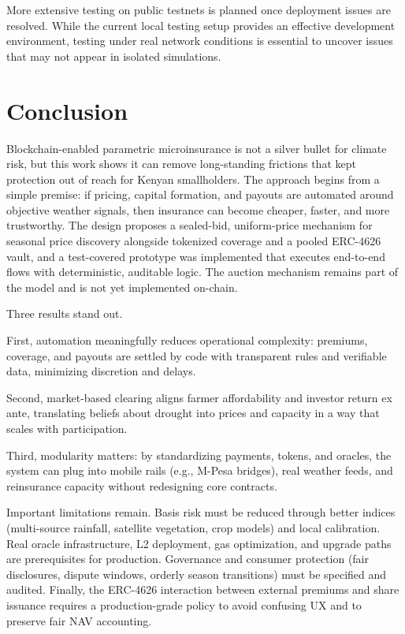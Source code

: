 \documentclass[11pt,a4paper]{article}
\begin{document}
		More extensive testing on public testnets is planned once deployment issues are resolved.
		While the current local testing setup provides an effective development environment, testing under real network conditions is essential to uncover issues that may not appear in isolated simulations.

		\section{Conclusion}\label{sec:conclusion}
		Blockchain-enabled parametric microinsurance is not a silver bullet for climate risk, but this work shows it can remove long-standing frictions that kept protection out of reach for Kenyan smallholders.
        The approach begins from a simple premise: if pricing, capital formation, and payouts are automated around objective weather signals, then insurance can become cheaper, faster, and more trustworthy.
        The design proposes a sealed-bid, uniform-price mechanism for seasonal price discovery alongside tokenized coverage and a pooled ERC-4626 vault, and a test-covered prototype was implemented that executes end-to-end flows with deterministic, auditable logic. The auction mechanism remains part of the model and is not yet implemented on-chain.

		Three results stand out.

        First, automation meaningfully reduces operational complexity: premiums, coverage, and payouts are settled by code with transparent rules and verifiable data, minimizing discretion and delays.

        Second, market-based clearing aligns farmer affordability and investor return ex ante, translating beliefs about drought into prices and capacity in a way that scales with participation.

        Third, modularity matters: by standardizing payments, tokens, and oracles, the system can plug into mobile rails (e.g., M-Pesa bridges), real weather feeds, and reinsurance capacity without redesigning core contracts.

		Important limitations remain.
        Basis risk must be reduced through better indices (multi-source rainfall, satellite vegetation, crop models) and local calibration.
        Real oracle infrastructure, L2 deployment, gas optimization, and upgrade paths are prerequisites for production.
        Governance and consumer protection (fair disclosures, dispute windows, orderly season transitions) must be specified and audited.
        Finally, the ERC-4626 interaction between external premiums and share issuance requires a production-grade policy to avoid confusing UX and to preserve fair NAV accounting.
\end{document}
